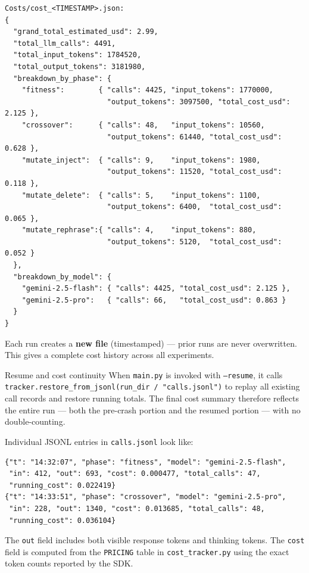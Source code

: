 \documentclass[11pt,a4paper]{report}
\begin{document}
\begin{verbatim}
Costs/cost_<TIMESTAMP>.json:
{
  "grand_total_estimated_usd": 2.99,
  "total_llm_calls": 4491,
  "total_input_tokens": 1784520,
  "total_output_tokens": 3181980,
  "breakdown_by_phase": {
    "fitness":        { "calls": 4425, "input_tokens": 1770000,
                        "output_tokens": 3097500, "total_cost_usd": 2.125 },
    "crossover":      { "calls": 48,   "input_tokens": 10560,
                        "output_tokens": 61440, "total_cost_usd": 0.628 },
    "mutate_inject":  { "calls": 9,    "input_tokens": 1980,
                        "output_tokens": 11520, "total_cost_usd": 0.118 },
    "mutate_delete":  { "calls": 5,    "input_tokens": 1100,
                        "output_tokens": 6400,  "total_cost_usd": 0.065 },
    "mutate_rephrase":{ "calls": 4,    "input_tokens": 880,
                        "output_tokens": 5120,  "total_cost_usd": 0.052 }
  },
  "breakdown_by_model": {
    "gemini-2.5-flash": { "calls": 4425, "total_cost_usd": 2.125 },
    "gemini-2.5-pro":   { "calls": 66,   "total_cost_usd": 0.863 }
  }
}
\end{verbatim}

Each run creates a \textbf{new file} (timestamped) --- prior runs are never overwritten.
This gives a complete cost history across all experiments.

\begin{conceptbox}{Resume and cost continuity}
When \texttt{main.py} is invoked with \texttt{--resume}, it calls
\texttt{tracker.restore\_from\_jsonl(run\_dir / "calls.jsonl")} to replay all existing
call records and restore running totals.  The final cost summary therefore reflects
the entire run --- both the pre-crash portion and the resumed portion --- with no
double-counting.
\end{conceptbox}

Individual JSONL entries in \texttt{calls.jsonl} look like:
\begin{verbatim}
{"t": "14:32:07", "phase": "fitness", "model": "gemini-2.5-flash",
 "in": 412, "out": 693, "cost": 0.000477, "total_calls": 47,
 "running_cost": 0.022419}
{"t": "14:33:51", "phase": "crossover", "model": "gemini-2.5-pro",
 "in": 228, "out": 1340, "cost": 0.013685, "total_calls": 48,
 "running_cost": 0.036104}
\end{verbatim}

The \texttt{out} field includes both visible response tokens and thinking tokens.
The \texttt{cost} field is computed from the \texttt{PRICING} table in
\texttt{cost\_tracker.py} using the exact token counts reported by the SDK.
\end{document}
